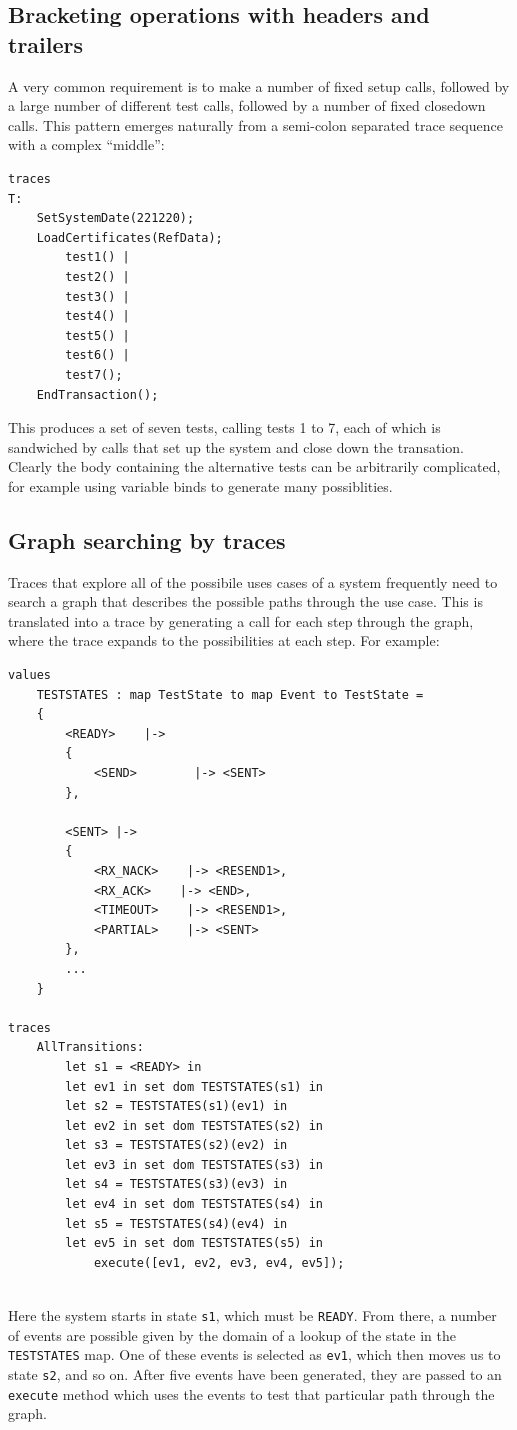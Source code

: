\documentclass{overturerepchap}
\begin{document}
\subsection{Bracketing operations with headers and trailers}

A very common requirement is to make a number of fixed setup calls,
followed by a large number of different test calls, followed by a number of
fixed closedown calls. This pattern emerges naturally from a semi-colon
separated trace sequence with a complex ``middle'':
\scriptsize
\begin{lstlisting}
traces
T:
    SetSystemDate(221220);
    LoadCertificates(RefData);
        test1() |
        test2() |
        test3() |
        test4() |
        test5() |
        test6() |
        test7();
    EndTransaction();
\end{lstlisting}
\normalsize
This produces a set of seven tests, calling tests 1 to 7, each of which is
sandwiched by calls that set up the system and close down the transation.
Clearly the body containing the alternative tests can be arbitrarily
complicated, for example using variable binds to generate many possiblities.

\subsection{Graph searching by traces}

Traces that explore all of the possibile uses cases of a system frequently
need to search a graph that describes the possible paths through the use case.
This is translated into a trace by generating a call for each step through the
graph, where the trace expands to the possibilities at each step. For example:
\scriptsize
\begin{lstlisting}
values
    TESTSTATES : map TestState to map Event to TestState =
    {
        <READY>    |->
        {
            <SEND>        |-> <SENT>
        },

        <SENT> |->
        {
            <RX_NACK>    |-> <RESEND1>,
            <RX_ACK>    |-> <END>,
            <TIMEOUT>    |-> <RESEND1>,
            <PARTIAL>    |-> <SENT>
        },
        ...
    }

traces
    AllTransitions:
        let s1 = <READY> in
        let ev1 in set dom TESTSTATES(s1) in
        let s2 = TESTSTATES(s1)(ev1) in
        let ev2 in set dom TESTSTATES(s2) in
        let s3 = TESTSTATES(s2)(ev2) in
        let ev3 in set dom TESTSTATES(s3) in
        let s4 = TESTSTATES(s3)(ev3) in
        let ev4 in set dom TESTSTATES(s4) in
        let s5 = TESTSTATES(s4)(ev4) in
        let ev5 in set dom TESTSTATES(s5) in
            execute([ev1, ev2, ev3, ev4, ev5]);
 
\end{lstlisting}
\normalsize
Here the system starts in state \texttt{s1}, which must be \texttt{READY}. From
there, a number of events are possible given by the domain of a lookup of the
state in the \texttt{TESTSTATES} map. One of these events is selected as
\texttt{ev1}, which then moves us to state \texttt{s2}, and so on. After five
events have been generated, they are passed to an \texttt{execute} method which
uses the events to test that particular path through the graph.
\end{document}
